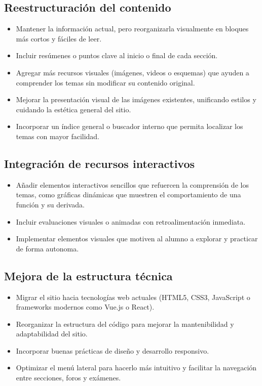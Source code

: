 \documentclass[11pt,a4paper]{article}
\begin{document}
\subsection{Reestructuraci\'on del contenido}
\begin{itemize}[left=0pt,labelsep=5pt]
    \item Mantener la informaci\'on actual, pero reorganizarla visualmente en bloques m\'as cortos y f\'aciles de leer.
    \item Incluir res\'umenes o puntos clave al inicio o final de cada secci\'on.
    \item Agregar m\'as recursos visuales (im\'agenes, videos o esquemas) que ayuden a comprender los temas sin modificar su contenido original.
    \item Mejorar la presentaci\'on visual de las im\'agenes existentes, unificando estilos y cuidando la est\'etica general del sitio.
    \item Incorporar un índice general o buscador interno que permita localizar los temas con mayor facilidad.
\end{itemize}

\subsection{Integraci\'on de recursos interactivos}
\begin{itemize}[left=0pt,labelsep=5pt]
    \item A\~nadir elementos interactivos sencillos que refuercen la comprensi\'on de los temas, como gr\'aficas din\'amicas que muestren el comportamiento de una funci\'on y su derivada.
    \item Incluir evaluaciones visuales o animadas con retroalimentaci\'on inmediata.
    \item Implementar elementos visuales que motiven al alumno a explorar y practicar de forma autonoma.
\end{itemize}

\subsection{Mejora de la estructura t\'ecnica}
\begin{itemize}[left=0pt,labelsep=5pt]
    \item Migrar el sitio hacia tecnolog\'ias web actuales (HTML5, CSS3, JavaScript o frameworks modernos como Vue.js o React).
    \item Reorganizar la estructura del c\'odigo para mejorar la mantenibilidad y adaptabilidad del sitio.
    \item Incorporar buenas pr\'acticas de dise\~no y desarrollo responsivo.
    \item Optimizar el men\'u lateral para hacerlo m\'as intuitivo y facilitar la navegaci\'on entre secciones, foros y ex\'amenes.
\end{itemize}
\end{document}
